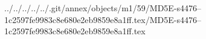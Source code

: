 ../../../../../.git/annex/objects/m1/59/MD5E-s4476--1c2597fe9983c8e680e2eb9859e8a1ff.tex/MD5E-s4476--1c2597fe9983c8e680e2eb9859e8a1ff.tex